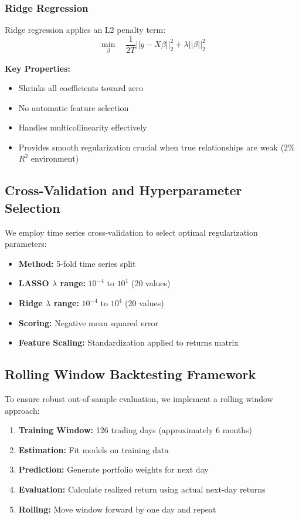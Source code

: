 \documentclass[12pt]{article}
\begin{document}
\subsubsection{Ridge Regression}
Ridge regression applies an L2 penalty term:
\begin{equation}
\min_\beta \quad \frac{1}{2T} ||y - X\beta||_2^2 + \lambda ||\beta||_2^2
\end{equation}

\textbf{Key Properties:}
\begin{itemize}
    \item Shrinks all coefficients toward zero
    \item No automatic feature selection
    \item Handles multicollinearity effectively
    \item Provides smooth regularization crucial when true relationships are weak (2\% $R^2$ environment)
\end{itemize}

\subsection{Cross-Validation and Hyperparameter Selection}
We employ time series cross-validation to select optimal regularization parameters:
\begin{itemize}
    \item \textbf{Method:} 5-fold time series split
    \item \textbf{LASSO $\lambda$ range:} $10^{-4}$ to $10^{1}$ (20 values)
    \item \textbf{Ridge $\lambda$ range:} $10^{-4}$ to $10^{4}$ (20 values)
    \item \textbf{Scoring:} Negative mean squared error
    \item \textbf{Feature Scaling:} Standardization applied to returns matrix
\end{itemize}

\subsection{Rolling Window Backtesting Framework}
To ensure robust out-of-sample evaluation, we implement a rolling window approach:

\begin{enumerate}
    \item \textbf{Training Window:} 126 trading days (approximately 6 months)
    \item \textbf{Estimation:} Fit models on training data
    \item \textbf{Prediction:} Generate portfolio weights for next day
    \item \textbf{Evaluation:} Calculate realized return using actual next-day returns
    \item \textbf{Rolling:} Move window forward by one day and repeat
\end{enumerate}
\end{document}
